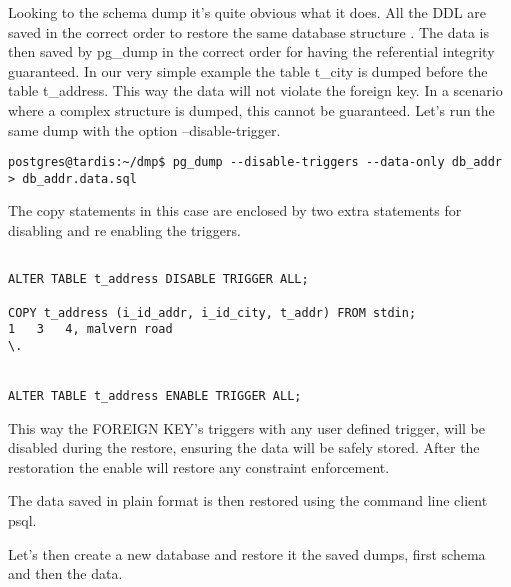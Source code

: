 Looking to the schema dump it's quite obvious what it does. All the DDL are saved in the correct 
order to restore the same database structure .\newline
The data is then saved by pg\_dump in the correct order for having the referential integrity 
guaranteed. In our very simple example the table t\_city is dumped before the table t\_address. 
This way the data will not violate the foreign key. In a scenario where a complex structure 
is dumped, this cannot be guaranteed. Let's run the same dump with the option --disable-trigger.

\begin{verbatim}
postgres@tardis:~/dmp$ pg_dump --disable-triggers --data-only db_addr > db_addr.data.sql

\end{verbatim}

The copy statements in this case are enclosed by two extra statements for disabling and re enabling 
the triggers.

\begin{lstlisting}[style=pgsql]

ALTER TABLE t_address DISABLE TRIGGER ALL;

COPY t_address (i_id_addr, i_id_city, t_addr) FROM stdin;
1	3	4, malvern road 
\.


ALTER TABLE t_address ENABLE TRIGGER ALL;

\end{lstlisting}

This way the FOREIGN KEY's triggers with any user defined trigger, will be disabled during the 
restore, ensuring the data will be safely stored. After the restoration the enable will restore any 
constraint enforcement.\newline

The data saved in plain format is then restored using the command line client psql.

Let's then create a new database and restore it the saved dumps, first schema and then the data.

